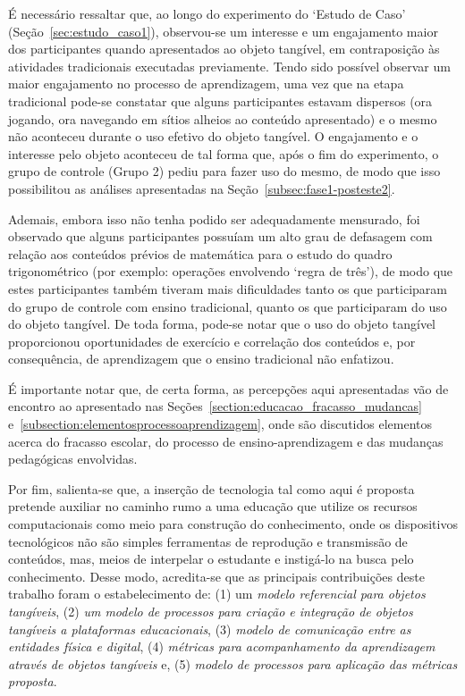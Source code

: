 É necessário ressaltar que, ao longo do experimento do `Estudo de Caso' (Seção~\ref{sec:estudo_caso1}), observou-se um interesse e um engajamento maior dos participantes quando apresentados ao objeto tangível, em contraposição às atividades tradicionais executadas previamente. Tendo sido possível observar um maior engajamento no processo de aprendizagem, uma vez que na etapa tradicional pode-se constatar que alguns participantes estavam dispersos (ora jogando, ora navegando em sítios alheios ao conteúdo apresentado) e o mesmo não aconteceu durante o uso efetivo do objeto tangível. O engajamento e o interesse pelo objeto aconteceu de tal forma que, após o fim do experimento, o grupo de controle (Grupo 2) pediu para fazer uso do mesmo, de modo que isso possibilitou as análises apresentadas na Seção~\ref{subsec:fase1-posteste2}.

Ademais, embora isso não tenha podido ser adequadamente mensurado, foi observado que alguns participantes possuíam um alto grau de defasagem com relação aos conteúdos prévios de matemática para o estudo do quadro trigonométrico (por exemplo: operações envolvendo `regra de três'), de modo que estes participantes também tiveram mais dificuldades tanto os que participaram do grupo de controle com ensino tradicional, quanto os que participaram do uso do objeto tangível. De toda forma, pode-se notar que o uso do objeto tangível proporcionou oportunidades de exercício e correlação dos conteúdos e, por consequência, de aprendizagem que o ensino tradicional não enfatizou. 

É importante notar que, de certa forma, as percepções aqui apresentadas vão de encontro ao apresentado nas Seções~\ref{section:educacao_fracasso_mudancas} e~\ref{subsection:elementosprocessoaprendizagem}, onde são discutidos elementos acerca do fracasso escolar, do processo de ensino-aprendizagem e das mudanças pedagógicas envolvidas.

Por fim, salienta-se que,
a inserção de tecnologia tal como aqui é proposta pretende auxiliar no caminho rumo a uma educação que utilize os recursos computacionais como meio para construção do conhecimento,%
 onde os dispositivos tecnológicos não são simples ferramentas de reprodução e transmissão de conteúdos, mas, meios de interpelar o estudante e instigá-lo na busca pelo conhecimento. Desse modo, acredita-se que as principais contribuições deste trabalho foram o estabelecimento de: (1) um \textit{modelo referencial para objetos tangíveis}, (2) \textit{um modelo de processos para criação e integração de objetos tangíveis a plataformas educacionais}, (3) \textit{modelo de comunicação entre as entidades física e digital}, (4) \textit{métricas para acompanhamento da aprendizagem através de objetos tangíveis} e, (5) \textit{modelo de processos para aplicação das métricas proposta}.

